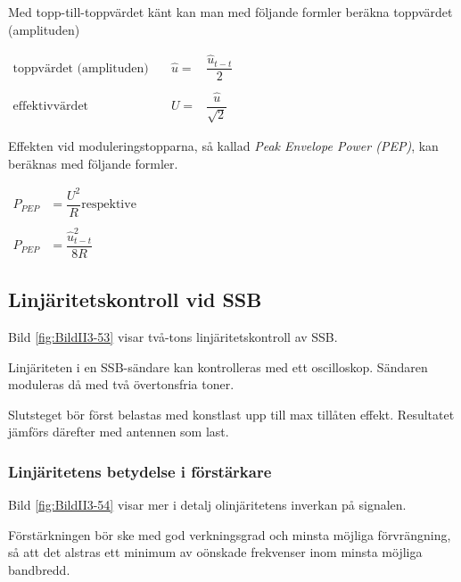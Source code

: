 Med topp-till-toppvärdet känt kan man med följande formler beräkna
toppvärdet (amplituden)

\(
\begin{array}{lll}
\text{toppvärdet (amplituden)} &  \quad \hat{u}= & \dfrac{\hat{u}_{t-t}}{2}\\
& & \\
\text{effektivvärdet} &\quad  U =& \dfrac{\hat{u}}{\sqrt{2}}
\end{array}
\)

Effekten vid moduleringstopparna, så kallad \emph{Peak Envelope Power (PEP)},
kan beräknas med följande formler.

\(
\begin{array}{ll}
P_{PEP} & = \dfrac{U^2}{R} \text{respektive} \\
&\\
P_{PEP} & = \dfrac{\hat{u}_{t-t}^2}{8R}
\end{array}
\)

\subsection{Linjäritetskontroll vid SSB}


Bild \ref{fig:BildII3-53} visar två-tons linjäritetskontroll av SSB.

Linjäriteten i en SSB-sändare kan kontrolleras med ett oscilloskop.
Sändaren moduleras då med två övertonsfria toner.

Slutsteget bör först belastas med konstlast upp till max tillåten effekt.
Resultatet jämförs därefter med antennen som last.

\subsubsection{Linjäritetens betydelse i förstärkare}


Bild \ref{fig:BildII3-54} visar mer i detalj olinjäritetens inverkan på
signalen.

Förstärkningen bör ske med god verkningsgrad och minsta möjliga förvrängning,
så att det alstras ett minimum av oönskade frekvenser inom minsta möjliga
bandbredd.

